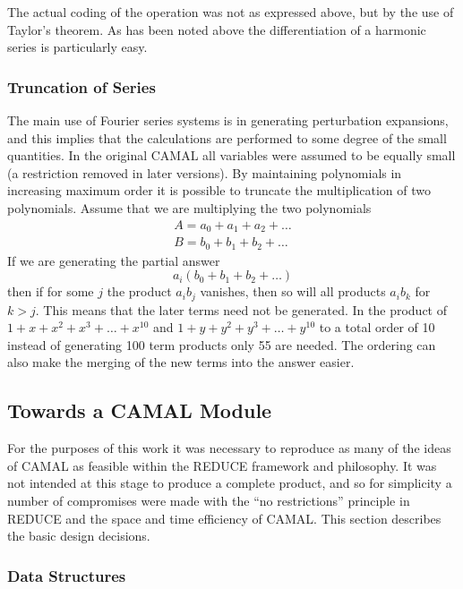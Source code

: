 The actual coding of the operation was not as expressed above, but by
the use of Taylor's theorem.  As has been noted above the
differentiation of a harmonic series is particularly easy.

\subsubsection{Truncation of Series}

The main use of Fourier series systems is in generating perturbation
expansions, and this implies that the calculations are performed to
some degree of the small quantities.  In the original CAMAL all
variables were assumed to be equally small (a restriction removed in
later versions).  By maintaining polynomials in increasing maximum
order it is possible to truncate the multiplication of two
polynomials.  Assume that we are multiplying the two polynomials
\begin{eqnarray*}
        A = a_0 + a_1 + a_2 + \ldots \\
        B = b_0 + b_1 + b_2 + \ldots
\end{eqnarray*}
If we are generating the partial answer
\[
        a_i (b_0 + b_1 + b_2 + \ldots)
\]
then if for some $j$ the product $a_i b_j$ vanishes, then so will all
products $a_i b_k$ for $k>j$.  This means that the later terms need
not be generated.  In the product of $1+x+x^2+x^3+\ldots+x^{10}$ and
$1+y+y^2+y^3+\ldots+y^{10}$ to a total order of 10 instead of generating
100 term products only 55 are needed.  The ordering can also make the
merging of the new terms into the answer easier.

\subsection{Towards a CAMAL Module}

For the purposes of this work it was necessary to reproduce as many of
the ideas of CAMAL as feasible within the REDUCE framework and
philosophy.  It was not intended at this stage to produce a complete
product, and so for simplicity a number of compromises were made with
the ``no restrictions'' principle in REDUCE and the space and time
efficiency of CAMAL.  This section describes the basic design
decisions.

\subsubsection{Data Structures}

